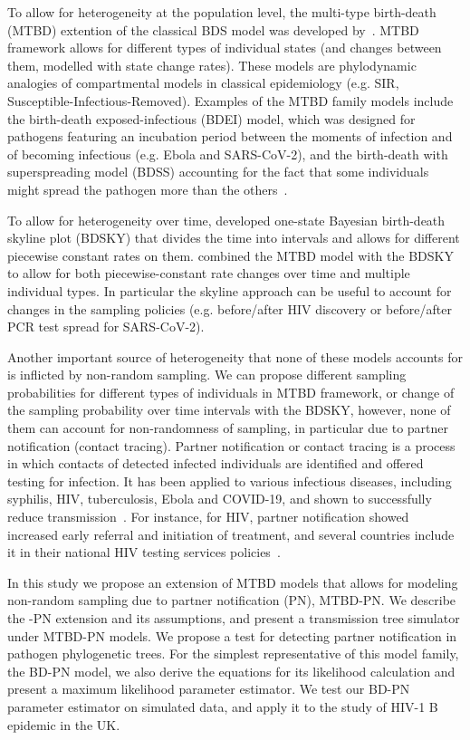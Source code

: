 \documentclass[a4paper,10pt]{article}
\begin{document}
To allow for heterogeneity at the population level, the multi-type birth-death (MTBD) extention of the classical BDS model was developed by~\citet{Stadler2013a}. MTBD framework allows for different types of individual states (and changes between them, modelled with state change rates). These models are phylodynamic analogies of compartmental models in classical epidemiology (e.g. SIR, Susceptible-Infectious-Removed).  Examples of the MTBD family models include the birth-death exposed-infectious (BDEI) model, which was designed for pathogens featuring an incubation period between the moments of infection and of becoming infectious (e.g. Ebola and SARS-CoV-2), and the birth-death with superspreading model (BDSS) accounting for the fact that some individuals might spread the pathogen more than the others~\citep{Stadler2014}.

To allow for heterogeneity over time, \citet{Stadler2013} developed one-state Bayesian birth-death skyline plot (BDSKY) that divides the time into intervals and allows for different piecewise constant rates on them. \citet{Kuhnert2016} combined the MTBD model with the BDSKY to allow for both piecewise-constant rate changes over time and multiple individual types. In particular the skyline approach can be useful to account for changes in the sampling policies (e.g. before/after HIV discovery or before/after PCR test spread for SARS-CoV-2).


Another important source of heterogeneity that none of these models accounts for is inflicted by non-random sampling. We can propose different sampling probabilities for different types of individuals in MTBD framework, or change of the sampling probability over time intervals with the BDSKY, however, none of them can account for non-randomness of sampling, in particular due to partner notification (contact tracing). Partner notification or contact tracing is a process in which contacts of detected infected individuals are identified and offered testing for infection. It has been applied to various infectious diseases, including syphilis, HIV, tuberculosis, Ebola and COVID-19, and shown to successfully reduce transmission~\citep{el-sadrContactTracingBarriers2022}. For instance, for HIV,  partner notification showed increased early referral and initiation of treatment, and several countries include it in their national HIV testing services policies~\citep{worldhealthorganizationCountryPolicyReview2016}. 


In this study we propose an extension of MTBD models that allows for modeling non-random sampling due to partner notification (PN), MTBD-PN. We describe the -PN extension and its assumptions, and present a transmission tree simulator under MTBD-PN models. We propose a test for detecting partner notification in pathogen phylogenetic trees. For the simplest representative of this model family, the BD-PN model, we also derive the equations for its likelihood calculation and present a maximum likelihood parameter estimator. We test our BD-PN parameter estimator on simulated data, and apply it to the study of HIV-1 B epidemic in the UK. 
\end{document}

